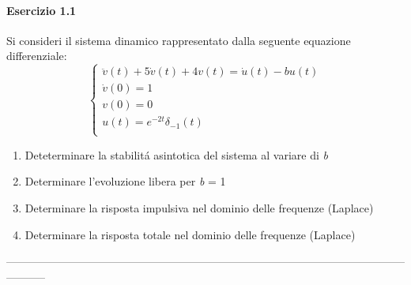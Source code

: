 \documentclass[12pt,a4paper]{article}
\begin{document}
	\paragraph*{Esercizio 1.1}
	Si consideri il sistema dinamico rappresentato dalla seguente equazione differenziale:
	\[
		\begin{cases}
   		\ddot{v}(t) + 5\dot{v}(t) + 4v(t) = \dot{u}(t) - bu(t) \\
   		\dot{v}(0) = 1 \\
   		v(0) = 0 \\
   		u(t) = e^{-2t} \delta_{-1}(t) \\
   		\end{cases}
   	\]
   	\begin{enumerate}
   		\item Deteterminare la stabilit\'a asintotica del sistema al variare di \textit{b}
   		\item Determinare l'evoluzione libera per \textit{b} = 1
   		\item Determinare la risposta impulsiva nel dominio delle frequenze (Laplace)
   		\item Determinare la risposta totale nel dominio delle frequenze (Laplace)
   	\end{enumerate}
   	-----------------------------------------------------------------------------------------------------------------------\\
\end{document}
